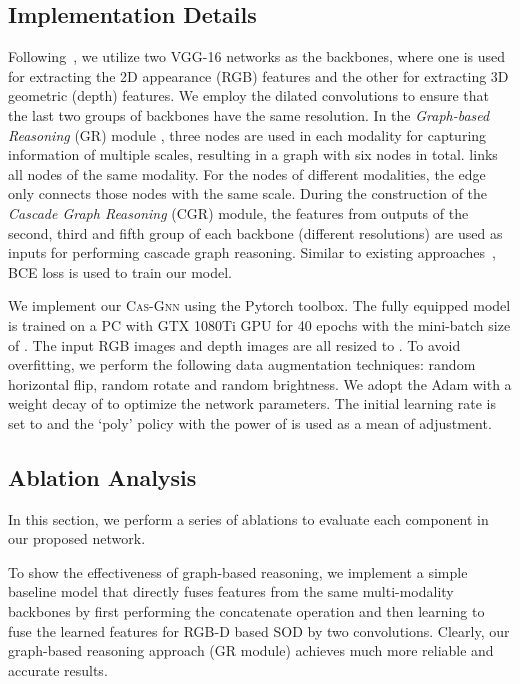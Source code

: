 \documentclass[runningheads]{llncs}
\begin{document}
\subsection{Implementation Details}	
Following~\cite{fan2019rethinking,Chen_2018_CVPR,chen2019multi,han2017cnns}, we utilize two VGG-16 networks as the backbones, where one is used for extracting the 2D appearance (RGB) features and the other for extracting 3D geometric (depth) features. We employ the dilated convolutions to ensure that the last two groups of backbones have the same resolution. In the {\em Graph-based Reasoning} (GR) module , three nodes are used in each modality for capturing information of multiple scales, resulting in a graph  with six nodes in total.  links all nodes of the same modality. For the nodes of different modalities, the edge only connects those nodes with the same scale. During the construction of the {\em Cascade Graph Reasoning} (CGR) module, the features from outputs of the second, third and fifth group of each backbone (different resolutions) are used as inputs for performing cascade graph reasoning. Similar to existing approaches~\cite{Chen_2018_CVPR,chen2019multi,han2017cnns}, BCE loss is used to train our model.

We implement our {\scshape{Cas-Gnn}} using the Pytorch toolbox. The fully equipped model is trained on a PC with GTX 1080Ti GPU for 40 epochs with the mini-batch size of . The input RGB images and depth images are all resized to . To avoid overfitting, we perform the following data augmentation techniques: random horizontal flip, random rotate and random brightness. We adopt the Adam with a weight decay of  to optimize the network parameters. The initial learning rate is set to  and the `poly' policy with the power of  is used as a mean of adjustment.

\subsection{Ablation Analysis}
In this section, we perform a series of ablations to evaluate each component in our proposed network.

 To show the effectiveness of graph-based reasoning, we implement a simple baseline model that directly fuses features from the same multi-modality backbones by first performing the concatenate operation and then learning to fuse the learned features for RGB-D based SOD by two  convolutions. Clearly, our graph-based reasoning approach (GR module) achieves much more reliable and accurate results. 
\end{document}
